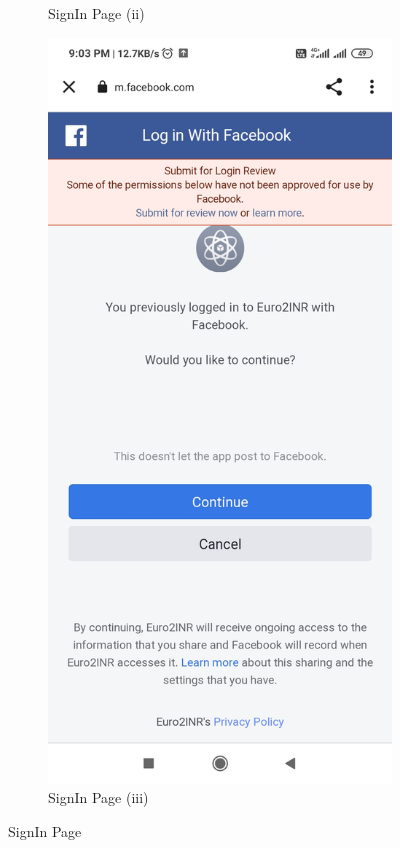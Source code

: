 \documentclass[12pt]{article}
\begin{document}
\begin{figure}[h]
\begin{subfigure}[h]{0.3\textwidth}
\caption{SignIn Page (ii)}
\label{SignIn Page (ii)}
\end{subfigure}
\hfill
\begin{subfigure}[h]{0.3\textwidth}
\centering
\includegraphics[scale=0.065]{146977733-f1145a34-ac72-4aaf-b907-f2fae2e42296.jpg}
\caption{SignIn Page (iii)}
\label{SignIn Page (iii)}
\end{subfigure}
\caption{SignIn Page}
\label{SignIn Page}
\end{figure}
\end{document}
